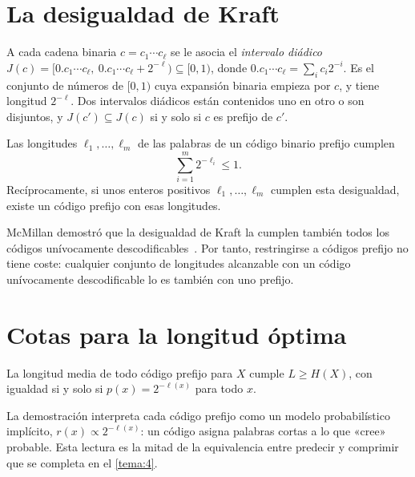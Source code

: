 \addtocounter{definicion}{1}%

\section{La desigualdad de Kraft}

A cada cadena binaria $c=c_1\cdots c_\ell$ se le asocia el \emph{intervalo diádico} $J(c)=[0.c_1\cdots c_\ell,\ 0.c_1\cdots c_\ell+2^{-\ell})\subseteq[0,1)$, donde $0.c_1\cdots c_\ell=\sum_{i}c_i2^{-i}$. Es el conjunto de números de $[0,1)$ cuya expansión binaria empieza por $c$, y tiene longitud $2^{-\ell}$. Dos intervalos diádicos están contenidos uno en otro o son disjuntos, y $J(c')\subseteq J(c)$ si y solo si $c$ es prefijo de $c'$.

\begin{teorema}\label{teo:kraft}
Las longitudes $\ell_1,\dots,\ell_m$ de las palabras de un código binario prefijo cumplen
\[
\sum_{i=1}^{m}2^{-\ell_i}\le 1.
\]
Recíprocamente, si unos enteros positivos $\ell_1,\dots,\ell_m$ cumplen esta desigualdad, existe un código prefijo con esas longitudes.
\end{teorema}

\addtocounter{figure}{1}%

\begin{observacion}
McMillan demostró que la desigualdad de Kraft la cumplen también todos los códigos unívocamente descodificables~\cite[§5.5]{ct}. Por tanto, restringirse a códigos prefijo no tiene coste: cualquier conjunto de longitudes alcanzable con un código unívocamente descodificable lo es también con uno prefijo.
\end{observacion}

\section{Cotas para la longitud óptima}

\begin{teorema}\label{teo:cota-inferior}
La longitud media de todo código prefijo para $X$ cumple $L\ge H(X)$, con igualdad si y solo si $p(x)=2^{-\ell(x)}$ para todo $x$.
\end{teorema}

La demostración interpreta cada código prefijo como un modelo probabilístico implícito, $r(x)\propto2^{-\ell(x)}$: un código asigna palabras cortas a lo que «cree» probable. Esta lectura es la mitad de la equivalencia entre predecir y comprimir que se completa en el \cref{tema:4}.

